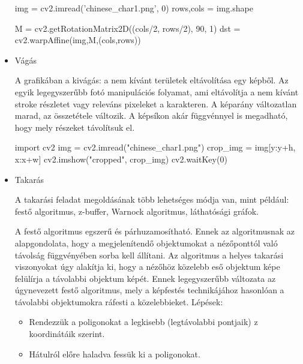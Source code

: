 \begin{itemize}
\begin{python}
img = cv2.imread('chinese_char1.png', 0)
rows,cols = img.shape

M = cv2.getRotationMatrix2D((cols/2, rows/2), 90, 1)
dst = cv2.warpAffine(img,M,(cols,rows))
\end{python}

\item Vágás

A grafikában a kivágás: a nem kívánt területek eltávolítása egy képből. Az egyik legegyszerűbb fotó manipulációs folyamat, ami eltávolítja a nem kívánt stroke részletet vagy releváns pixeleket a karakteren. A képarány változatlan marad, az összetétele változik. A képsíkon akár függvénnyel is megadható, hogy mely részeket távolítsuk el.

\begin{python}
import cv2
img = cv2.imread("chinese_char1.png")
crop_img = img[y:y+h, x:x+w]
cv2.imshow("cropped", crop_img)
cv2.waitKey(0)
\end{python}

\item Takarás

A takarási feladat megoldásának több lehetséges módja van, mint például: festő algoritmus, z-buffer, Warnock algoritmus, láthatósági gráfok.

A festő algoritmus egszerű és párhuzamosítható. Ennek az algoritmusnak az alapgondolata, hogy a megjelenítendő objektumokat a nézőponttól való távolság függvényében sorba kell állítani. Az algoritmus a helyes takarási viszonyokat úgy alakítja ki, hogy a nézőhöz közelebb eső objektum képe felülírja a távolabbi objektum képét. Ennek legegyszerűbb változata az úgynevezett festő algoritmus, mely a képfestés technikájához hasonlóan a távolabbi objektumokra ráfesti a közelebbieket.
Lépések:
\begin{itemize}
\item Rendezzük a poligonokat a legkisebb (legtávolabbi pontjaik) z koordinátáik szerint.
\item Hátulról előre haladva fessük ki a poligonokat. 
\end{itemize}

\end{itemize}